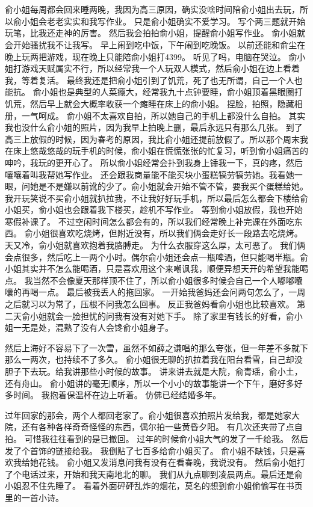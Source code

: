 \chapter{}
俞小姐每周都会回来睡两晚，我因为高三原因，确实没啥时间陪俞小姐出去玩，所以俞小姐会老老实实和我写作业。
只是俞小姐确实不爱学习。
写个两三题就开始玩笔，比我还走神的厉害。
然后我会拍拍俞小姐，提醒俞小姐写作业。
俞小姐就会开始骚扰我不让我写。
早上闹到吃中饭，下午闹到吃晚饭。
以前还能和俞尘在晚上玩两把游戏，现在晚上只能陪俞小姐打4399。
听见了吗，电脑在哭泣。
俞小姐打游戏天赋属实不行，所以经常我一个人玩双人模式，然后俞小姐在边上看着我，等着复活。
最终我还是把俞小姐引到了饥荒，死了也无所谓，自己一个人也能抗。
俞小姐也是典型的人菜瘾大，经常我九十点钟要睡，俞小姐顶着黑眼圈打饥荒，然后早上就会大概率收获一个瘫睡在床上的俞小姐。
捏脸，拍照，隐藏相册，一气呵成。
俞小姐不太喜欢自拍，所以她自己的手机上都没什么自拍。
其实我也没什么俞小姐的照片，因为我早上拍晚上删，最后永远只有那么几张。
到了高三上放假的时候，因为春考的原因，我比俞小姐还提前放假了。所以那个周末我在床上悠哉悠哉的玩手机的时候，俞小姐在慌慌张张的忙复习，听到俞小姐痛苦的呻吟，我玩的更开心了。
所以俞小姐经常会扑到我身上锤我一下，真的疼，然后嚷嚷着叫我帮她写作业。
还会跟我商量能不能买块小蛋糕犒劳犒劳她。我看她一眼，问她是不是嫌以前讹的少了。俞小姐就会开始不管不管，要我买个蛋糕给她。
我开玩笑说不买俞小姐就扒拉我，不让我好好玩手机，所以最后怎么都会下楼给俞小姐买，俞小姐也会跟着我下楼买，趁机不写作业。
等到俞小姐放假，我也开始寒假补课了。
不过空闲时间怎么都会有的，所以我们经常晚上补完课在外面吃东西。
俞小姐很喜欢吃烧烤，但附近没有，所以我们俩会走好长一段路去吃烧烤。天又冷，俞小姐就喜欢抱着我胳膊走。
为什么衣服穿这么厚，太可恶了。
我们俩会点很多，然后吃上一两个小时。偶尔俞小姐还会点一瓶啤酒，但只能喝半瓶。俞小姐其实并不怎么能喝酒，只是喜欢用这个来嘲讽我，顺便异想天开的希望我能喝点。
我当然不会像夏天那样顶不住了，所以俞小姐很多时候会自己一个人嘟嘟囔囔的再喝一点。
最后被我丢人的拖回家。
一开始我爸妈还会问两句怎么了，一周之后就习以为常了，压根不问我怎么回事。
反正我爸妈看俞小姐也比较喜欢。
第二天俞小姐就会一脸担忧的问我有没有对她下手。
除了家里有钱长的好看，俞小姐一无是处，混熟了没有人会馋俞小姐身子。

然后上海好不容易下了一次雪，虽然不如薛之谦唱的那么夸张，但一年差不多就下那么一两次，也持续不了多久。
俞小姐很无聊的扒拉着我在阳台看雪，自己却没胆子下去玩。给我讲那些小时候的故事。
讲来讲去就是大院，俞青瑶，俞小土，还有舟山。
俞小姐讲的毫无顺序，所以一个小小的故事能讲一个下午，磨好多好多时间。
我抱着保温杯在边上听着。
仿佛已经结婚多年。

过年回家的那会，两个人都回老家了。俞小姐很喜欢拍照片发给我，都是她家大院，还有各种各样奇奇怪怪的东西，偶尔拍一些黄昏夕阳。
有几次还夹带了点自拍。
可惜我往往看到的是已撤回。
过年的时候俞小姐大气的发了一千给我。
然后发了个首饰的链接给我。
我倒贴了七百多给俞小姐买了。
俞小姐不缺钱，只是喜欢我给她花钱。
俞小姐又发消息问我有没有在看春晚，我说没有。
然后俞小姐打了个电话过来，开始和我天南地北的聊。
我们从九点聊到凌晨两点。最后还是俞小姐忍不住先睡了。
看着外面砰砰乱炸的烟花，莫名的想到俞小姐偷偷写在书页里的一首小诗。

